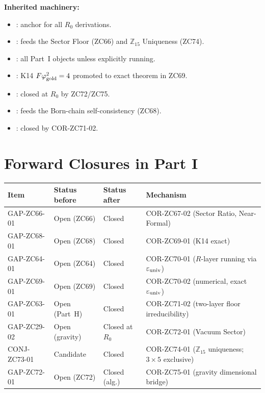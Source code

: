 \documentclass[12pt, a4paper]{article}
\begin{document}
\begin{inheritbox}[title={Part I Backward Inheritance}]
\textbf{Inherited machinery:}
\begin{itemize}[leftmargin=1.5em]
\item {}: anchor for all
  $R_0$ derivations.
\item {}:
  feeds the Sector Floor (ZC66) and $\mathbb{Z}_{15}$ Uniqueness (ZC74).
\item {}: all Part~I
  objects unless explicitly running.
\item {}: K14
  $F\varphi_{\rm gold}^2=4$ promoted to exact theorem in ZC69.
\item {}: closed at $R_0$ by
  ZC72/ZC75.
\item {}: feeds the
  Born-chain self-consistency (ZC68).
\item {}: closed by
  COR-ZC71-02.
\end{itemize}
\end{inheritbox}

\section{Forward Closures in Part I}
\label{sec:xlviii-forward}

\begin{conmapbox}[title={Part I Master Closure Table}]
\begin{longtable}{@{}p{3.4cm}p{2.4cm}p{2.4cm}p{4.6cm}@{}}
\toprule
Item & Status before & Status after & Mechanism \\
\midrule
\endhead
GAP-ZC66-01 & Open (ZC66) & Closed & COR-ZC67-02 (Sector Ratio, Near-Formal) \\
\addlinespace
GAP-ZC68-01 & Open (ZC68) & Closed & COR-ZC69-01 (K14 exact) \\
\addlinespace
GAP-ZC64-01 & Open (ZC64) & Closed & COR-ZC70-01 ($R$-layer running via $\varepsilon_{\rm univ}$) \\
\addlinespace
GAP-ZC69-01 & Open (ZC69) & Closed & COR-ZC70-02 (numerical, exact $\varepsilon_{\rm univ}$) \\
\addlinespace
GAP-ZC63-01 & Open (Part~H) & Closed & COR-ZC71-02 (two-layer floor irreducibility) \\
\addlinespace
GAP-ZC29-02 & Open (gravity) & Closed at $R_0$ & COR-ZC72-01 (Vacuum Sector) \\
\addlinespace
CONJ-ZC73-01 & Candidate & Closed & COR-ZC74-01 ($\mathbb{Z}_{15}$ uniqueness; $3\times5$ exclusive) \\
\addlinespace
GAP-ZC72-01 & Open (ZC72) & Closed (alg.) & COR-ZC75-01 (gravity dimensional bridge) \\
\bottomrule
\end{longtable}
\end{conmapbox}
\end{document}
